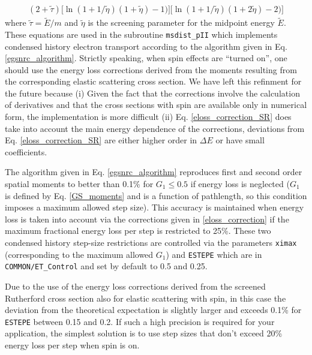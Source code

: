 \begin{itemize}
\begin{equation}
\begin{split}
{(2 + \tilde{\tau}) \Big[
\ln(1 + 1/\tilde{\eta}) (1 + \tilde{\eta}) - 1) \Big]
\Big[ \ln(1 + 1/\tilde{\eta}) (1 + 2 \tilde{\eta}) - 2) \Big] }
\end{split}
\end{equation}
where $\tilde{\tau} = \tilde{E}/m$ and
$\tilde{\eta}$ is the screening parameter for
the midpoint energy $\tilde{E}$.
These equations are used in the subroutine {\tt msdist\_pII}
which implements condensed history electron transport according
to the algorithm given in Eq. \eqref{egsnrc_algorithm}.
Strictly speaking, when spin effects are ``turned on'', one
should use the energy loss corrections derived
from the moments resulting from the corresponding elastic scattering
cross section. We have left this refinment for the future because
(i) Given the fact that the corrections involve the calculation
of derivatives and that the cross sections with spin are
available only in numerical form, the implementation is more
difficult (ii) Eq. \eqref{eloss_correction_SR} does take into
account the main energy dependence of the corrections, deviations
from Eq. \eqref{eloss_correction_SR} are either higher order
in $\Delta E$ or have small coefficients.

The algorithm given in Eq. \eqref{egsnrc_algorithm} reproduces
first and second order spatial moments to better than 0.1\% for
$G_1 \le 0.5$ if energy loss is neglected ($G_1$ is defined by Eq.
\eqref{GS_moments} and is a function of pathlength, so this condition
imposes a maximum allowed step size). This accuracy
is maintained when energy loss is taken into account via
the corrections given in \eqref{eloss_correction} if
the maximum fractional energy loss per step is
restricted to 25\%. These two condensed history
step-size restrictions are controlled via the
parameters {\tt ximax} (corresponding to the maximum allowed $G_1$)
and {\tt ESTEPE} which are in {\tt COMMON/ET\_Control} and set by default
to 0.5 and 0.25.

Due to the use of the energy loss corrections derived from the
screened Rutherford cross section also for elastic scattering
with spin, in this case the deviation from the theoretical expectation
is slightly larger and exceeds 0.1\% for {\tt ESTEPE} between
0.15 and 0.2. If such a high precision is required for
your application, the simplest solution is to use step sizes
that don't exceed 20\% energy loss per step when spin is on.
\end{itemize}


